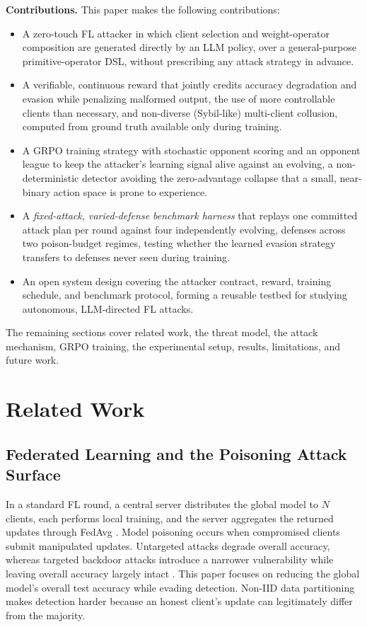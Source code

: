 \documentclass[conference,9pt]{IEEEtran}
\begin{document}
\textbf{Contributions.} This paper makes the following contributions:
\begin{itemize}
    \item A zero-touch FL attacker in which client selection and weight-operator composition are generated directly by an LLM policy, over a general-purpose primitive-operator DSL, without prescribing any attack strategy in advance.
    \item A verifiable, continuous reward that jointly credits accuracy degradation and evasion while penalizing malformed output, the use of more controllable clients than necessary, and non-diverse (Sybil-like) multi-client collusion, computed from ground truth available only during training.
   \item A GRPO training strategy with stochastic opponent scoring and an opponent league to keep the attacker's learning signal alive against an evolving, a non-deterministic detector avoiding the zero-advantage collapse that a small, near-binary action space is prone to experience.
    \item A \emph{fixed-attack, varied-defense benchmark harness} that replays one committed attack plan per round against four independently evolving, defenses across two poison-budget regimes, testing whether the learned evasion strategy transfers to defenses never seen during training.
    \item An open system design covering the attacker contract, reward, training schedule, and benchmark protocol, forming a reusable testbed for studying autonomous, LLM-directed FL attacks.
\end{itemize}

The remaining sections cover related work, the threat model, the attack mechanism, GRPO training, the experimental setup, results, limitations, and future work.

\section{Related Work}
\label{sec:related}

\subsection{Federated Learning and the Poisoning Attack Surface}
In a standard FL round, a central server distributes the global model to $N$ clients, each performs local training, and the server aggregates the returned updates through FedAvg \cite{fedavg}. Model poisoning occurs when compromised clients submit manipulated updates. Untargeted attacks degrade overall accuracy, whereas targeted backdoor attacks introduce a narrower vulnerability while leaving overall accuracy largely intact \cite{bagdasaryan2020,wang2020attackoftails}. This paper focuses on reducing the global model's overall test accuracy while evading detection. Non-IID data partitioning makes detection harder because an honest client's update can legitimately differ from the majority.
\end{document}
